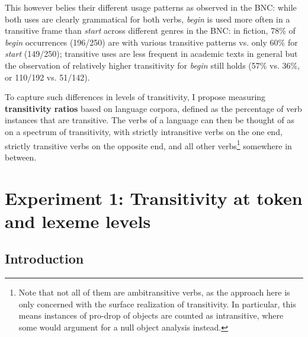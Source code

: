 \begin{exe}
\ex\label{example-begin_start}
  \begin{xlist}
  \end{xlist}
\end{exe}

This however belies their different usage patterns as observed in the BNC: while both uses are clearly grammatical for both verbs, \textit{begin} is used more often in a transitive frame than \textit{start} across different genres in the BNC: in fiction, 78\% of \textit{begin} occurrences (196/250) are with various transitive patterns vs. only 60\% for \textit{start} (149/250); transitive uses are less frequent in academic texts in general but the observation of relatively higher transitivity for \textit{begin} still holds (57\% vs. 36\%, or 110/192 vs. 51/142).

To capture such differences in levels of transitivity, I propose measuring \textbf{transitivity ratios} based on language corpora, defined as the percentage of verb instances that are transitive. The verbs of a language can then be thought of as on a spectrum of transitivity, with strictly intransitive verbs on the one end, strictly transitive verbs on the opposite end, and all other verbs\footnote{Note that not all of them are ambitransitive verbs, as the approach here is only concerned with the surface realization of transitivity. In particular, this means instances of pro-drop of objects are counted as intransitive, where some would argument for a null object analysis instead.} somewhere in between.

\section{Experiment 1: Transitivity at token and lexeme levels}\label{sec:exp1}

\subsection{Introduction}

